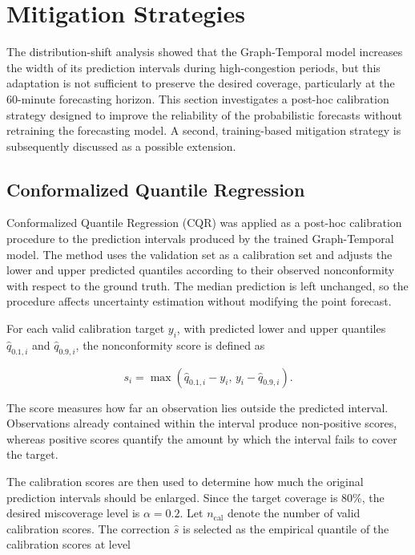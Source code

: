 \section{Mitigation Strategies}
\label{sec:mitigation}

The distribution-shift analysis showed that the Graph-Temporal model
increases the width of its prediction intervals during high-congestion
periods, but this adaptation is not sufficient to preserve the desired
coverage, particularly at the 60-minute forecasting horizon. This section
investigates a post-hoc calibration strategy designed to improve the
reliability of the probabilistic forecasts without retraining the forecasting
model. A second, training-based mitigation strategy is subsequently discussed
as a possible extension.

\subsection{Conformalized Quantile Regression}
\label{subsec:cqr}

Conformalized Quantile Regression (CQR) was applied as a post-hoc calibration
procedure to the prediction intervals produced by the trained Graph-Temporal
model. The method uses the validation set as a calibration set and adjusts
the lower and upper predicted quantiles according to their observed
nonconformity with respect to the ground truth. The median prediction is left
unchanged, so the procedure affects uncertainty estimation without modifying
the point forecast.

For each valid calibration target $y_i$, with predicted lower and upper
quantiles $\hat{q}_{0.1,i}$ and $\hat{q}_{0.9,i}$, the nonconformity score is
defined as

\begin{equation}
    s_i =
    \max\left(
        \hat{q}_{0.1,i} - y_i,\,
        y_i - \hat{q}_{0.9,i}
    \right).
    \label{eq:cqr_score}
\end{equation}

The score measures how far an observation lies outside the predicted
interval. Observations already contained within the interval produce
non-positive scores, whereas positive scores quantify the amount by which
the interval fails to cover the target.

The calibration scores are then used to determine how much the original
prediction intervals should be enlarged. Since the target coverage is 80\%,
the desired miscoverage level is $\alpha=0.2$. Let $n_{\mathrm{cal}}$ denote
the number of valid calibration scores. The correction $\hat{s}$ is selected
as the empirical quantile of the calibration scores at level

